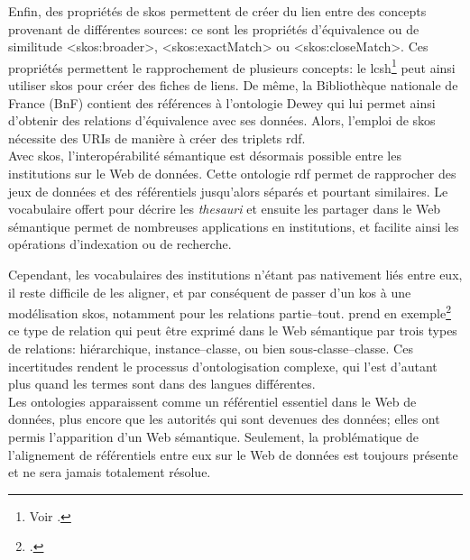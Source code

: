 Enfin, des propriétés de \ac{skos} permettent de créer du lien entre des concepts provenant de différentes sources: ce sont les propriétés d'équivalence ou de similitude <skos:broader>, <skos:exactMatch> ou <skos:closeMatch>. Ces propriétés permettent le rapprochement de plusieurs concepts: le \ac{lcsh}\footnote{Voir .} peut ainsi utiliser \ac{skos} pour créer des fiches de liens. De même, la Bibliothèque nationale de France (BnF) contient des références à l'ontologie Dewey qui lui permet ainsi d'obtenir des relations d'équivalence avec ses données. Alors, l'emploi de \ac{skos} nécessite des URIs de manière à créer des triplets \ac{rdf}.\\

Avec \ac{skos}, l'interopérabilité sémantique est désormais possible entre les institutions sur le Web de données. Cette ontologie \ac{rdf} permet de rapprocher des jeux de données et des référentiels jusqu'alors séparés et pourtant similaires. Le vocabulaire offert pour décrire les \textit{thesauri} et ensuite les partager dans le Web sémantique permet de nombreuses applications en institutions, et facilite ainsi les opérations d'indexation ou de recherche.

\bigskip
\bigskip
Cependant, les vocabulaires des institutions n'étant pas nativement liés entre eux, il reste difficile de les aligner, et par conséquent de passer d'un \ac{kos} à une modélisation \ac{skos}, notamment pour les relations partie--tout.  prend en exemple\footcite{dalbin_approches_2011} ce type de relation qui peut être exprimé dans le Web sémantique par trois types de relations: hiérarchique, instance--classe, ou bien sous-classe--classe. Ces incertitudes rendent le processus d'ontologisation complexe, qui l'est d'autant plus quand les termes sont dans des langues différentes.\\

Les ontologies apparaissent comme un référentiel essentiel dans le Web de données, plus encore que les autorités qui sont devenues des données; elles ont permis l'apparition d'un Web sémantique. Seulement, la problématique de l'alignement de référentiels entre eux sur le Web de données est toujours présente et ne sera jamais totalement résolue.